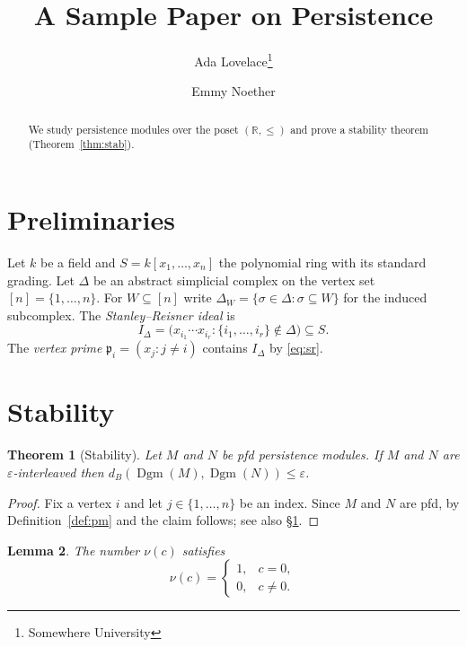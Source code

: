 \documentclass[11pt]{article}
\title{A Sample Paper on Persistence}
\author{Ada Lovelace\thanks{Somewhere University} \and Emmy Noether}
\date{}
\theoremstyle{plain}
\newtheorem{theorem}{Theorem}[section]
\newtheorem{lemma}[theorem]{Lemma}
\theoremstyle{definition}
\newcommand{\kk}{k}
\newcommand{\RR}{\mathbb{R}}
\DeclareMathOperator{\Dgm}{Dgm}
\begin{document}
\maketitle

\begin{abstract}
We study persistence modules over the poset $(\RR,\le)$ and prove a stability theorem (Theorem~\ref{thm:stab}).
\end{abstract}

\section{Preliminaries}\label{sec:prelim}

Let $\kk$ be a field and $S=\kk[x_1,\dots,x_n]$ the polynomial ring with its standard grading.
Let $\Delta$ be an abstract simplicial complex on the vertex set $[n]=\{1,\dots,n\}$.
For $W\subseteq[n]$ write $\Delta_W=\{\sigma\in\Delta:\sigma\subseteq W\}$ for the induced subcomplex.
The \emph{Stanley--Reisner ideal} is
\begin{equation}\label{eq:sr}
I_\Delta=\big(x_{i_1}\cdots x_{i_r}:\{i_1,\dots,i_r\}\notin\Delta\big)\subseteq S.
\end{equation}
The \emph{vertex prime} $\mathfrak p_i=(x_j:j\neq i)$ contains $I_\Delta$ by \eqref{eq:sr}.



\section{Stability}\label{sec:stab}

\begin{theorem}[Stability]\label{thm:stab}
Let $M$ and $N$ be pfd persistence modules. If $M$ and $N$ are $\varepsilon$-interleaved then
$d_B(\Dgm(M),\Dgm(N))\le\varepsilon$.
\end{theorem}

\begin{proof}
Fix a vertex $i$ and let $j\in\{1,\dots,n\}$ be an index. Since $M$ and $N$ are pfd, by Definition~\ref{def:pm} and \cite[Thm.~4.4]{bauer2015induced} the claim follows; see also \S\ref{sec:prelim}.
\end{proof}

\begin{lemma}\label{lem:cases}
The number $\nu(c)$ satisfies
\[
\nu(c)=
\begin{cases}
1, & c=0,\\[2pt]
0, & c\ne 0.
\end{cases}
\]
\end{lemma}
\end{document}
